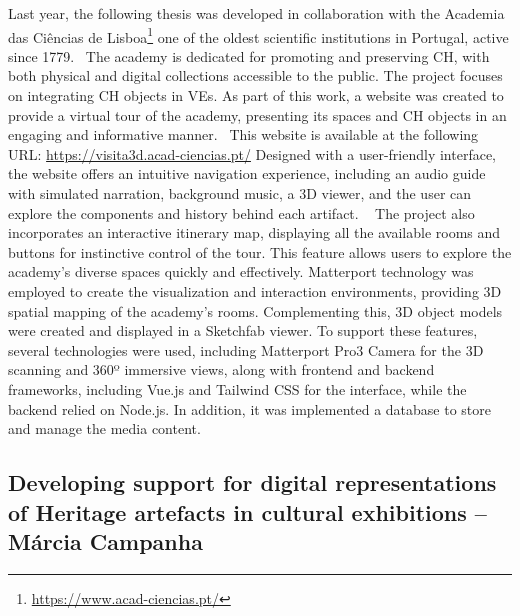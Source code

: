Last year, the following thesis was developed in collaboration with the Academia das Ciências de Lisboa\footnote{\url{https://www.acad-ciencias.pt/}} one of the oldest scientific institutions in Portugal, active since 1779.~\cite{tecnicoAcademia} 
The academy is dedicated for promoting and preserving \gls{CH}, with both physical and digital collections accessible to the public. 
The project focuses on integrating \gls{CH} objects in \glspl{VE}. As part of this work, a website was created to provide a virtual tour of the academy, presenting its spaces and \gls{CH} objects in an engaging and informative manner.~\cite{tese_tourFaria2024} 
This website is available at the following URL: \url{https://visita3d.acad-ciencias.pt/} 
Designed with a user-friendly interface, the website offers an intuitive navigation experience, including an audio guide with simulated narration, background music, a \gls{3D} viewer, and the user can explore the components and history behind each artifact. 
~\cite{academiaCiencias2024} The project also incorporates an interactive itinerary map, displaying all the available rooms and buttons for instinctive control of the tour. This feature allows users to explore the academy's diverse spaces quickly and effectively.
Matterport technology was employed to create the visualization and interaction environments, providing \gls{3D} spatial mapping of the academy's rooms. Complementing this, \gls{3D} object models were created and displayed in a Sketchfab viewer. 
To support these features, several technologies were used, including Matterport Pro3 Camera for the \gls{3D} scanning and 360º immersive views, along with frontend and backend frameworks, including Vue.js and Tailwind CSS for the interface, 
while the backend relied on Node.js. In addition, it was implemented a database to store and manage the media content.

\subsection{Developing support for digital representations of Heritage artefacts in cultural exhibitions – Márcia Campanha}
\label{sec:marcia_thesis}

